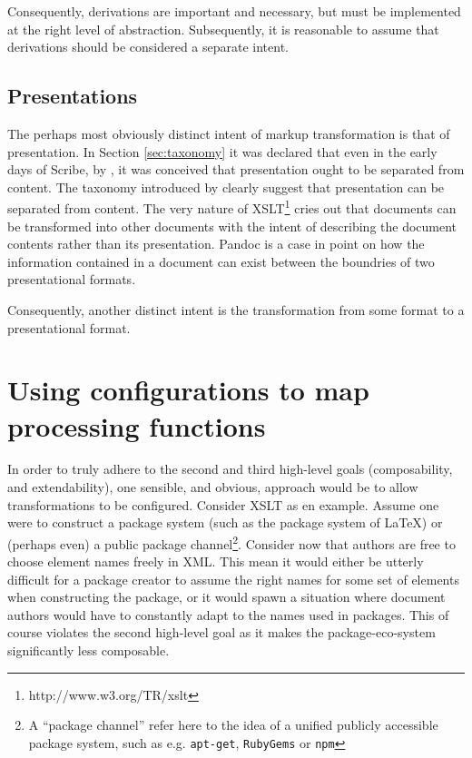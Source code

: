 \documentclass{scrreprt}
\begin{document}
Consequently, derivations are important and necessary, but must be implemented at the right level of abstraction. Subsequently, it is reasonable to assume that derivations should be considered a separate intent.

\subsection{Presentations}
The perhaps most obviously distinct intent of markup transformation is that of presentation. In Section \ref{sec:taxonomy} it was declared that even in the early days of Scribe, by \citet{reid}, it was conceived that presentation ought to be separated from content. The taxonomy introduced by \citet{coombs} clearly suggest that presentation can be separated from content. The very nature of XSLT\footnote{http://www.w3.org/TR/xslt} cries out that documents can be transformed into other documents with the intent of describing the document contents rather than its presentation. Pandoc is a case in point on how the information contained in a document can exist between the boundries of two presentational formats.

Consequently, another distinct intent is the transformation from some format to a presentational format.




\section{Using configurations to map processing functions}
\label{sec:applying-three-step-model-to-quad-b}
In order to truly adhere to the second and third high-level goals (composability, and extendability), one sensible, and obvious, approach would be to allow transformations to be configured. Consider XSLT as en example. Assume one were to construct a package system (such as the package system of \LaTeX) or (perhaps even) a public package channel\footnote{A ``package channel'' refer here to the idea of a unified publicly accessible package system, such as e.g. \texttt{apt-get}, \texttt{RubyGems} or \texttt{npm}}. Consider now that authors are free to choose element names freely in XML. This mean it would either be utterly difficult for a package creator to assume the right names for some set of elements when constructing the package, or it would spawn a situation where document authors would have to constantly adapt to the names used in packages. This of course violates the second high-level goal as it makes the package-eco-system significantly less composable.
\end{document}
